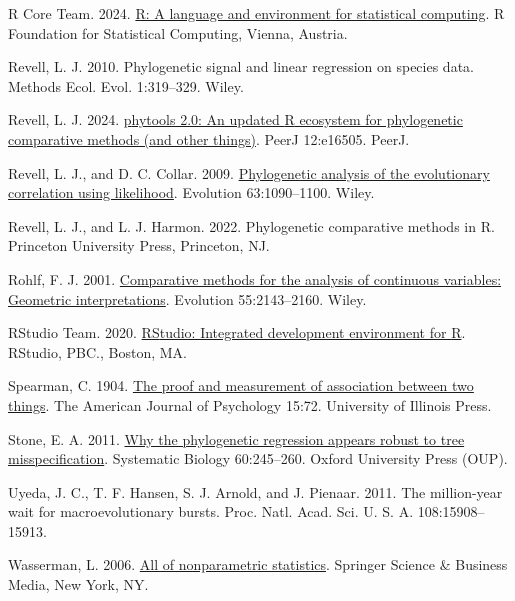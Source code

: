 \documentclass[fleqn,10pt,lineno]{wlpeerj} %
\newlength{\cslhangindent}
\newenvironment{CSLReferences}[2] %
 {\begin{list}{}{%
  \setlength{\itemindent}{0pt}
  \setlength{\leftmargin}{0pt}
  \setlength{\parsep}{0pt}
  \ifodd #1
   \setlength{\leftmargin}{\cslhangindent}
   \setlength{\itemindent}{-1\cslhangindent}
  \fi
  \setlength{\itemsep}{#2\baselineskip}}}
 {\end{list}}
\begin{document}
\begin{CSLReferences}{1}{0}
R Core Team. 2024. \href{https://www.R-project.org/}{R: A language and environment for statistical computing}. R Foundation for Statistical Computing, Vienna, Austria.

Revell, L. J. 2010. Phylogenetic signal and linear regression on species data. Methods Ecol. Evol. 1:319--329. Wiley.

Revell, L. J. 2024. \href{https://doi.org/10.7717/peerj.16505}{{p}hytools 2.0: An updated {R} ecosystem for phylogenetic comparative methods (and other things)}. PeerJ 12:e16505. PeerJ.

Revell, L. J., and D. C. Collar. 2009. \href{https://doi.org/10.1111/j.1558-5646.2009.00616.x}{Phylogenetic analysis of the evolutionary correlation using likelihood}. Evolution 63:1090--1100. Wiley.

Revell, L. J., and L. J. Harmon. 2022. Phylogenetic comparative methods in {R}. Princeton University Press, Princeton, NJ.

Rohlf, F. J. 2001. \href{https://doi.org/10.1111/j.0014-3820.2001.tb00731.x}{Comparative methods for the analysis of continuous variables: Geometric interpretations}. Evolution 55:2143--2160. Wiley.

RStudio Team. 2020. \href{http://www.rstudio.com/}{R{S}tudio: Integrated development environment for {R}}. RStudio, PBC., Boston, MA.

Spearman, C. 1904. \href{https://doi.org/10.2307/1412159}{The proof and measurement of association between two things}. The American Journal of Psychology 15:72. University of Illinois Press.

Stone, E. A. 2011. \href{https://doi.org/10.1093/sysbio/syq098}{Why the phylogenetic regression appears robust to tree misspecification}. Systematic Biology 60:245--260. Oxford University Press (OUP).

Uyeda, J. C., T. F. Hansen, S. J. Arnold, and J. Pienaar. 2011. The million-year wait for macroevolutionary bursts. Proc. Natl. Acad. Sci. U. S. A. 108:15908--15913.

Wasserman, L. 2006. \href{https://doi.org/10.1007/0-387-30623-4}{All of nonparametric statistics}. Springer Science \& Business Media, New York, NY.


\end{CSLReferences}
\end{document}
